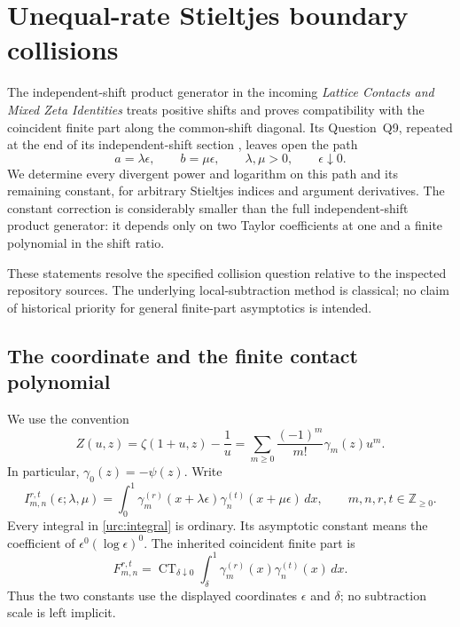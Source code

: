 
\section{Unequal-rate Stieltjes boundary collisions}
\label{urc:section}

The independent-shift product generator in the incoming \emph{Lattice
Contacts and Mixed Zeta Identities} treats positive shifts and proves
compatibility with the coincident finite part along the common-shift
diagonal. Its Question~Q9, repeated at the end of its independent-shift
section \cite[Section~6 and Question~Q9]{LatticeIncoming}, leaves open the path
\[
 a=\lambda\epsilon,\qquad b=\mu\epsilon,\qquad
 \lambda,\mu>0,\qquad \epsilon\downarrow0.
\]
We determine every divergent power and logarithm on this path and its
remaining constant, for arbitrary Stieltjes indices and argument
derivatives. The constant correction is considerably smaller than the
full independent-shift product generator: it depends only on two Taylor
coefficients at one and a finite polynomial in the shift ratio.

These statements resolve the specified collision question relative to
the inspected repository sources. The underlying local-subtraction
method is classical; no claim of historical priority for general
finite-part asymptotics is intended.

\subsection{The coordinate and the finite contact polynomial}

We use the convention
\begin{equation}\label{urc:stieltjes}
 Z(u,z)=\zeta(1+u,z)-\frac1u
       =\sum_{m\ge0}\frac{(-1)^m}{m!}\gamma_m(z)u^m.
\end{equation}
In particular, $\gamma_0(z)=-\psi(z)$. Write
\begin{equation}\label{urc:integral}
 I_{m,n}^{r,t}(\epsilon;\lambda,\mu)
 =\int_0^1\gamma_m^{(r)}(x+\lambda\epsilon)
             \gamma_n^{(t)}(x+\mu\epsilon)\,dx,
 \qquad m,n,r,t\in\mathbb Z_{\ge0}.
\end{equation}
Every integral in \eqref{urc:integral} is ordinary. Its asymptotic
constant means the coefficient of $\epsilon^0(\log\epsilon)^0$.
The inherited coincident finite part is
\begin{equation}\label{urc:finitepart}
 F_{m,n}^{r,t}
 =\operatorname{CT}_{\delta\downarrow0}
    \int_\delta^1\gamma_m^{(r)}(x)\gamma_n^{(t)}(x)\,dx.
\end{equation}
Thus the two constants use the displayed coordinates $\epsilon$ and
$\delta$; no subtraction scale is left implicit.

